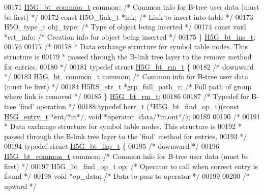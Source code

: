\begin{DoxyCode}
00171     \hyperlink{struct_h5_g__bt__common__t}{H5G\_bt\_common\_t} common;             \textcolor{comment}{/* Common info for B-tree user data (must be first) 
      */}
00172     \textcolor{keyword}{const} H5O\_link\_t *lnk;              \textcolor{comment}{/* Link to insert into table         */}
00173     H5O\_type\_t obj\_type;                \textcolor{comment}{/* Type of object being inserted */}
00174     \textcolor{keyword}{const} \textcolor{keywordtype}{void} *crt\_info;               \textcolor{comment}{/* Creation info for object being inserted */}
00175 \} \hyperlink{struct_h5_g__bt__ins__t}{H5G\_bt\_ins\_t};
00176 
00177 \textcolor{comment}{/*}
00178 \textcolor{comment}{ * Data exchange structure for symbol table nodes.  This structure is}
00179 \textcolor{comment}{ * passed through the B-link tree layer to the remove method for entries.}
00180 \textcolor{comment}{ */}
00181 \textcolor{keyword}{typedef} \textcolor{keyword}{struct }\hyperlink{struct_h5_g__bt__rm__t}{H5G\_bt\_rm\_t} \{
00182     \textcolor{comment}{/* downward */}
00183     \hyperlink{struct_h5_g__bt__common__t}{H5G\_bt\_common\_t} common;         \textcolor{comment}{/* Common info for B-tree user data (must be first) */}
00184     H5RS\_str\_t *grp\_full\_path\_r;    \textcolor{comment}{/* Full path of group where link is removed */}
00185 \} \hyperlink{struct_h5_g__bt__rm__t}{H5G\_bt\_rm\_t};
00186 
00187 \textcolor{comment}{/* Typedef for B-tree 'find' operation */}
00188 \textcolor{keyword}{typedef} herr\_t (*H5G\_bt\_find\_op\_t)(\textcolor{keyword}{const} \hyperlink{struct_h5_g__entry__t}{H5G\_entry\_t} *ent\textcolor{comment}{/*in*/}, \textcolor{keywordtype}{void} *operator\_data\textcolor{comment}{/*in,out*/});
00189 
00190 \textcolor{comment}{/*}
00191 \textcolor{comment}{ * Data exchange structure for symbol table nodes.  This structure is}
00192 \textcolor{comment}{ * passed through the B-link tree layer to the 'find' method for entries.}
00193 \textcolor{comment}{ */}
00194 \textcolor{keyword}{typedef} \textcolor{keyword}{struct }\hyperlink{struct_h5_g__bt__lkp__t}{H5G\_bt\_lkp\_t} \{
00195     \textcolor{comment}{/* downward */}
00196     \hyperlink{struct_h5_g__bt__common__t}{H5G\_bt\_common\_t} common;         \textcolor{comment}{/* Common info for B-tree user data (must be first) */}
00197     H5G\_bt\_find\_op\_t op;            \textcolor{comment}{/* Operator to call when correct entry is found */}
00198     \textcolor{keywordtype}{void} *op\_data;                  \textcolor{comment}{/* Data to pass to operator */}
00199 
00200     \textcolor{comment}{/* upward */}

\end{DoxyCode}
